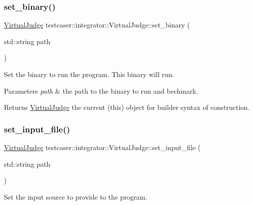 \subsubsection{\texorpdfstring{set\+\_\+binary()}{set\_binary()}}
{\footnotesize\ttfamily \hyperlink{classtestcaser_1_1integrator_1_1VirtualJudge}{Virtual\+Judge} testcaser\+::integrator\+::\+Virtual\+Judge\+::set\+\_\+binary (\begin{DoxyParamCaption}\item[{std\+::string}]{path }\end{DoxyParamCaption})\hspace{0.3cm}{\ttfamily [inline]}}



Set the binary to run the program. This binary will run. 


\begin{DoxyParams}{Parameters}
{\em path} & the path to the binary to run and bechmark. \\
\hline
\end{DoxyParams}
\begin{DoxyReturn}{Returns}
\hyperlink{classtestcaser_1_1integrator_1_1VirtualJudge}{Virtual\+Judge} the current (this) object for builder syntax of construction. 
\end{DoxyReturn}
\mbox{\label{classtestcaser_1_1integrator_1_1VirtualJudge_ad982d30de1a2f9033cb042313d748292}} 
\subsubsection{\texorpdfstring{set\+\_\+input\+\_\+file()}{set\_input\_file()}}
{\footnotesize\ttfamily \hyperlink{classtestcaser_1_1integrator_1_1VirtualJudge}{Virtual\+Judge} testcaser\+::integrator\+::\+Virtual\+Judge\+::set\+\_\+input\+\_\+file (\begin{DoxyParamCaption}\item[{std\+::string}]{path }\end{DoxyParamCaption})\hspace{0.3cm}{\ttfamily [inline]}}



Set the input source to provide to the program. 


